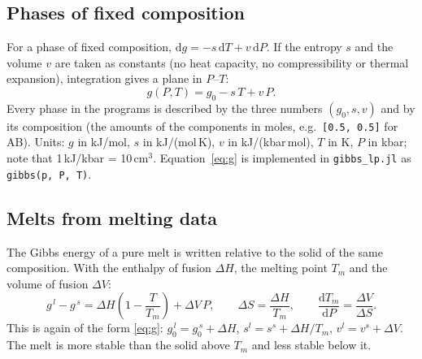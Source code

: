 \documentclass[11pt,a4paper]{article}
\newcommand{\file}[1]{\texttt{#1}}
\begin{document}
\subsection{Phases of fixed composition}
For a phase of fixed composition, $\mathrm{d}g = -s\,\mathrm{d}T + v\,\mathrm{d}P$. If the entropy $s$ and the
volume $v$ are taken as constants (no heat capacity, no compressibility or thermal expansion), integration
gives a plane in $P$–$T$:
\begin{equation}\label{eq:g}
  g(P,T) = g_0 - s\,T + v\,P .
\end{equation}
Every phase in the programs is described by the three numbers $(g_0, s, v)$ and by its composition (the
amounts of the components in moles, e.g.\ \lstinline{[0.5, 0.5]} for AB). Units: $g$ in kJ/mol, $s$ in kJ/(mol\,K),
$v$ in kJ/(kbar\,mol), $T$ in K, $P$ in kbar; note that 1\,kJ/kbar = 10\,cm$^3$.
Equation~\eqref{eq:g} is implemented in \file{gibbs\_lp.jl} as \lstinline{gibbs(p, P, T)}.

\subsection{Melts from melting data}
The Gibbs energy of a pure melt is written relative to the solid of the same composition. With the enthalpy
of fusion $\Delta H$, the melting point $T_m$ and the volume of fusion $\Delta V$:
\begin{equation}\label{eq:melt}
  g^{\,l} - g^{\,s} = \Delta H \left(1 - \frac{T}{T_m}\right) + \Delta V\,P ,
  \qquad \Delta S = \frac{\Delta H}{T_m},\qquad \frac{\mathrm{d}T_m}{\mathrm{d}P} = \frac{\Delta V}{\Delta S}.
\end{equation}
This is again of the form \eqref{eq:g}: $g_0^{\,l} = g_0^{\,s} + \Delta H$, $s^l = s^s + \Delta H/T_m$,
$v^l = v^s + \Delta V$. The melt is more stable than the solid above $T_m$ and less stable below it.
\end{document}
